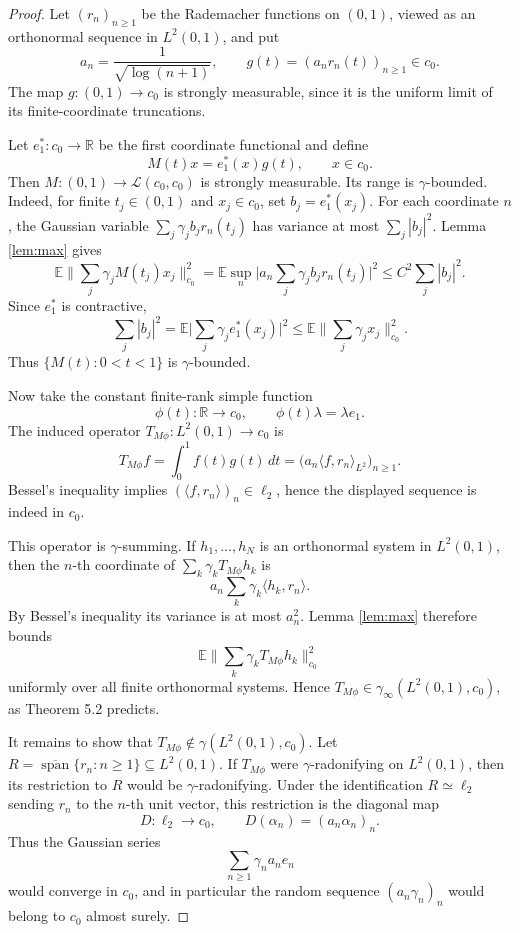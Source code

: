 \documentclass[11pt]{article}
\newcommand{\R}{\mathbb R}
\newcommand{\E}{\mathbb E}
\begin{document}
\begin{proof}
Let \((r_n)_{n\ge1}\) be the Rademacher functions on \((0,1)\), viewed as an
orthonormal sequence in \(L^2(0,1)\), and put
\[
  a_n=\frac{1}{\sqrt{\log(n+1)}},\qquad
  g(t)=(a_nr_n(t))_{n\ge1}\in c_0 .
\]
The map \(g:(0,1)\to c_0\) is strongly measurable, since it is the uniform
limit of its finite-coordinate truncations.

Let \(e_1^*:c_0\to\R\) be the first coordinate functional and define
\[
  M(t)x=e_1^*(x)g(t),\qquad x\in c_0.
\]
Then \(M:(0,1)\to\mathcal L(c_0,c_0)\) is strongly measurable.  Its range is
\(\gamma\)-bounded.  Indeed, for finite \(t_j\in(0,1)\) and \(x_j\in c_0\),
set \(b_j=e_1^*(x_j)\).  For each coordinate \(n\), the Gaussian variable
\(\sum_j\gamma_j b_j r_n(t_j)\) has variance at most \(\sum_j |b_j|^2\).
Lemma \ref{lem:max} gives
\[
  \E\Big\|\sum_j\gamma_j M(t_j)x_j\Big\|_{c_0}^2
  =
  \E\sup_n
  \Big|a_n\sum_j\gamma_j b_jr_n(t_j)\Big|^2
  \le
  C^2\sum_j |b_j|^2 .
\]
Since \(e_1^*\) is contractive,
\[
  \sum_j |b_j|^2
  =
  \E\Big|\sum_j\gamma_j e_1^*(x_j)\Big|^2
  \le
  \E\Big\|\sum_j\gamma_jx_j\Big\|_{c_0}^2.
\]
Thus \(\{M(t):0<t<1\}\) is \(\gamma\)-bounded.

Now take the constant finite-rank simple function
\[
  \phi(t):\R\to c_0,\qquad \phi(t)\lambda=\lambda e_1 .
\]
The induced operator \(T_{M\phi}:L^2(0,1)\to c_0\) is
\[
  T_{M\phi}f
  =
  \int_0^1 f(t)g(t)\,dt
  =
  \big(a_n\langle f,r_n\rangle_{L^2}\big)_{n\ge1}.
\]
Bessel's inequality implies \((\langle f,r_n\rangle)_n\in\ell_2\), hence
the displayed sequence is indeed in \(c_0\).

This operator is \(\gamma\)-summing.  If \(h_1,\ldots,h_N\) is an
orthonormal system in \(L^2(0,1)\), then the \(n\)-th coordinate of
\(\sum_k\gamma_kT_{M\phi}h_k\) is
\[
  a_n\sum_k\gamma_k\langle h_k,r_n\rangle .
\]
By Bessel's inequality its variance is at most \(a_n^2\).  Lemma
\ref{lem:max} therefore bounds
\[
  \E\Big\|\sum_k\gamma_kT_{M\phi}h_k\Big\|_{c_0}^2
\]
uniformly over all finite orthonormal systems.  Hence
\(T_{M\phi}\in\gamma_\infty(L^2(0,1),c_0)\), as Theorem 5.2 predicts.

It remains to show that \(T_{M\phi}\notin\gamma(L^2(0,1),c_0)\).  Let
\(R=\overline{\operatorname{span}}\{r_n:n\ge1\}\subseteq L^2(0,1)\).  If
\(T_{M\phi}\) were \(\gamma\)-radonifying on \(L^2(0,1)\), then its
restriction to \(R\) would be \(\gamma\)-radonifying.  Under the
identification \(R\simeq\ell_2\) sending \(r_n\) to the \(n\)-th unit vector,
this restriction is the diagonal map
\[
  D:\ell_2\to c_0,\qquad D(\alpha_n)=(a_n\alpha_n)_n .
\]
Thus the Gaussian series
\[
  \sum_{n\ge1}\gamma_n a_ne_n
\]
would converge in \(c_0\), and in particular the random sequence
\((a_n\gamma_n)_n\) would belong to \(c_0\) almost surely.


\end{proof}
\end{document}
